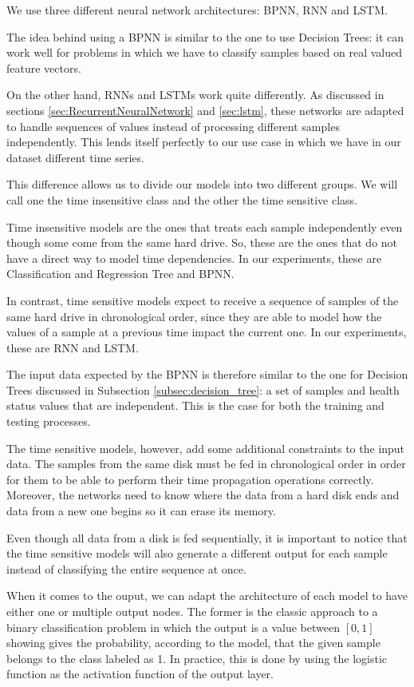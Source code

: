We use three different neural network architectures: BPNN, RNN and LSTM.

The idea behind using a BPNN is similar to the one to use Decision Trees: it can work well for problems in which we have to classify samples based on real valued feature vectors.

On the other hand, RNNs and LSTMs work quite differently.
As discussed in sections \ref{sec:RecurrentNeuralNetwork} and \ref{sec:lstm}, these networks are adapted to handle sequences of values instead of processing different samples independently.
This lends itself perfectly to our use case in which we have in our dataset different time series. 

This difference allows us to divide our models into two different groups.
We will call one the time insensitive class and the other the time sensitive class. 

Time insensitive models are the ones that treats each sample independently even though some come from the same hard drive.
So, these are the ones that do not have a direct way to model time dependencies.
In our experiments, these are Classification and Regression Tree and BPNN.

In contrast, time sensitive models expect to receive a sequence of samples of the same hard drive in chronological order, since they are able to model how the values of a sample at a previous time impact the current one.
In our experiments, these are RNN and LSTM.

The input data expected by the BPNN is therefore similar to the one for Decision Trees discussed in Subsection \ref{subsec:decision_tree}: a set of samples and health status values that are independent.
This is the case for both the training and testing processes.

The time sensitive models, however, add some additional constraints to the input data.
The samples from the same disk must be fed in chronological order in order for them to be able to perform their time propagation operations correctly.
Moreover, the networks need to know where the data from a hard disk ends and data from a new one begins so it can erase its memory.

Even though all data from a disk is fed sequentially, it is important to notice that the time sensitive models will also generate a different output for each sample instead of classifying the entire sequence at once.

When it comes to the ouput, we can adapt the architecture of each model to have either one or multiple output nodes.
The former is the classic approach to a binary classification problem in which the output is a value between $[0, 1]$ showing gives the probability, according to the model, that the given sample belongs to the class labeled as 1.
In practice, this is done by using the logistic function as the activation function of the output layer.

